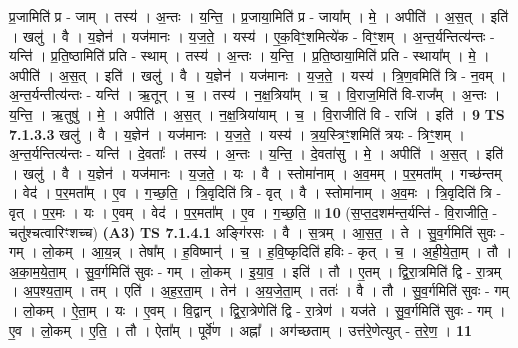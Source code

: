 \documentclass[17pt]{extarticle}
\begin{document}
                  प्र॒जामिति॑ प्र - जाम् । तस्य॑ । अ॒न्तः । य॒न्ति॒ । प्र॒जाया॒मिति॑ प्र - जाया᳚म् । मे॒ । अपीति॑ । अ॒स॒त् । इति॑ । खलु॑ । वै । य॒ज्ञेन॑ । यज॑मानः । य॒ज॒ते॒ । यस्य॑ । ए॒क॒विꣳ॒॒शमित्ये॑क - विꣳ॒॒शम् । अ॒न्त॒र्यन्तित्य॑न्तः - यन्ति॑ । प्र॒ति॒ष्ठामिति॑ प्रति - स्थाम् । तस्य॑ । अ॒न्तः । य॒न्ति॒ । प्र॒ति॒ष्ठाया॒मिति॑ प्रति - स्थाया᳚म् । मे॒ । अपीति॑ । अ॒स॒त् । इति॑ । खलु॑ । वै । य॒ज्ञेन॑ । यज॑मानः । य॒ज॒ते॒ । यस्य॑ । त्रि॒ण॒वमिति॑ त्रि - न॒वम् । अ॒न्त॒र्यन्तीत्य॑न्तः - यन्ति॑ । ऋ॒तून् । च॒ । तस्य॑ । न॒क्ष॒त्रिया᳚म् । च॒ । वि॒राज॒मिति॑ वि-राज᳚म् । अ॒न्तः । य॒न्ति॒ । ऋ॒तुषु॑ । मे॒ । अपीति॑ । अ॒स॒त् । न॒क्ष॒त्रिया॑याम् । च॒ । वि॒राजीति॑ वि - राजि॑ । इति॑ । \textbf{  9} \newline
                  \newline
                                \textbf{ TS 7.1.3.3} \newline
                  खलु॑ । वै । य॒ज्ञेन॑ । यज॑मानः । य॒ज॒ते॒ । यस्य॑ । त्र॒य॒स्त्रिꣳ॒॒शमिति॑ त्रयः - त्रिꣳ॒॒शम् । अ॒न्त॒र्यन्तित्य॑न्तः - यन्ति॑ । दे॒वताः᳚ । तस्य॑ । अ॒न्तः । य॒न्ति॒ । दे॒वता॑सु । मे॒ । अपीति॑ । अ॒स॒त् । इति॑ । खलु॑ । वै । य॒ज्ञेन॑ । यज॑मानः । य॒ज॒ते॒ । यः । वै । स्तोमा॑नाम् । अ॒व॒मम् । प॒र॒मता᳚म् । गच्छ॑न्तम् । वेद॑ । प॒र॒मता᳚म् । ए॒व । ग॒च्छ॒ति॒ । त्रि॒वृदिति॑ त्रि - वृत् । वै । स्तोमा॑नाम् । अ॒व॒मः । त्रि॒वृदिति॑ त्रि - वृत् । प॒र॒मः । यः । ए॒वम् । वेद॑ । प॒र॒मता᳚म् । ए॒व । ग॒च्छ॒ति॒ ॥ \textbf{  10} \newline
                  \newline
                      (स॒प्त॒द॒शम॑न्त॒र्यन्ति॑ - वि॒राजीति॒ - चतु॑श्चत्वारिꣳशच्च)  \textbf{(A3)} \newline \newline
                                \textbf{ TS 7.1.4.1} \newline
                  अङ्गि॑रसः । वै । स॒त्रम् । आ॒स॒त॒ । ते । सु॒व॒र्गमिति॑ सुवः - गम् । लो॒कम् । आ॒य॒न्न् । तेषा᳚म् । ह॒विष्मान्॑ । च॒ । ह॒वि॒ष्कृदिति॑ हविः - कृत् । च॒ । अ॒ही॒ये॒ता॒म् । तौ । अ॒का॒म॒ये॒ता॒म् । सु॒व॒र्गमिति॑ सुवः - गम् । लो॒कम् । इ॒या॒व॒ । इति॑ । तौ । ए॒तम् । द्वि॒रा॒त्रमिति॑ द्वि - रा॒त्रम् । अ॒प॒श्य॒ता॒म् । तम् । एति॑ । अ॒ह॒र॒ता॒म् । तेन॑ । अ॒य॒जे॒ता॒म् । ततः॑ । वै । तौ । सु॒व॒र्गमिति॑ सुवः - गम् । लो॒कम् । ऐ॒ता॒म् । यः । ए॒वम् । वि॒द्वान् । द्वि॒रा॒त्रेणेति॑ द्वि - रा॒त्रेण॑ । यज॑ते । सु॒व॒र्गमिति॑ सुवः - गम् । ए॒व । लो॒कम् । ए॒ति॒ । तौ । ऐता᳚म् । पूर्वे॑ण । अह्ना᳚ । अग॑च्छताम् । उत्त॑रे॒णेत्युत् - त॒रे॒ण॒ । \textbf{  11} \newline
                  \newline
\end{document}
